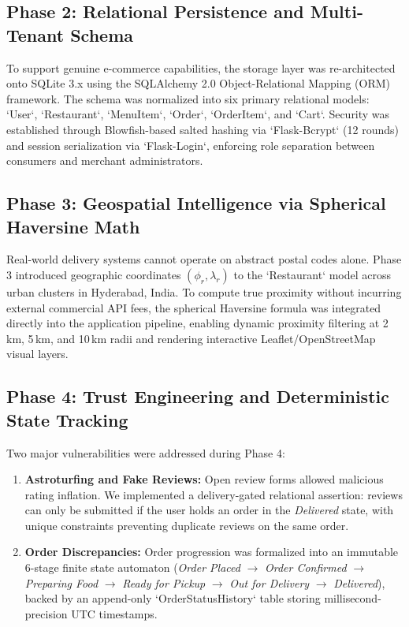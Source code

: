 \documentclass[conference]{IEEEtran}
\begin{document}
\subsection{Phase 2: Relational Persistence and Multi-Tenant Schema}
To support genuine e-commerce capabilities, the storage layer was re-architected onto SQLite 3.x using the SQLAlchemy 2.0 Object-Relational Mapping (ORM) framework. The schema was normalized into six primary relational models: `User`, `Restaurant`, `MenuItem`, `Order`, `OrderItem`, and `Cart`. Security was established through Blowfish-based salted hashing via `Flask-Bcrypt` (12 rounds) and session serialization via `Flask-Login`, enforcing role separation between consumers and merchant administrators.

\subsection{Phase 3: Geospatial Intelligence via Spherical Haversine Math}
Real-world delivery systems cannot operate on abstract postal codes alone. Phase 3 introduced geographic coordinates $(\phi_r, \lambda_r)$ to the `Restaurant` model across urban clusters in Hyderabad, India. To compute true proximity without incurring external commercial API fees, the spherical Haversine formula was integrated directly into the application pipeline, enabling dynamic proximity filtering at 2\,km, 5\,km, and 10\,km radii and rendering interactive Leaflet/OpenStreetMap visual layers.

\subsection{Phase 4: Trust Engineering and Deterministic State Tracking}
Two major vulnerabilities were addressed during Phase 4:
\begin{enumerate}
    \item \textbf{Astroturfing and Fake Reviews:} Open review forms allowed malicious rating inflation. We implemented a delivery-gated relational assertion: reviews can only be submitted if the user holds an order in the \textit{Delivered} state, with unique constraints preventing duplicate reviews on the same order.
    \item \textbf{Order Discrepancies:} Order progression was formalized into an immutable 6-stage finite state automaton (\textit{Order Placed} $\to$ \textit{Order Confirmed} $\to$ \textit{Preparing Food} $\to$ \textit{Ready for Pickup} $\to$ \textit{Out for Delivery} $\to$ \textit{Delivered}), backed by an append-only `OrderStatusHistory` table storing millisecond-precision UTC timestamps.
\end{enumerate}
\end{document}
